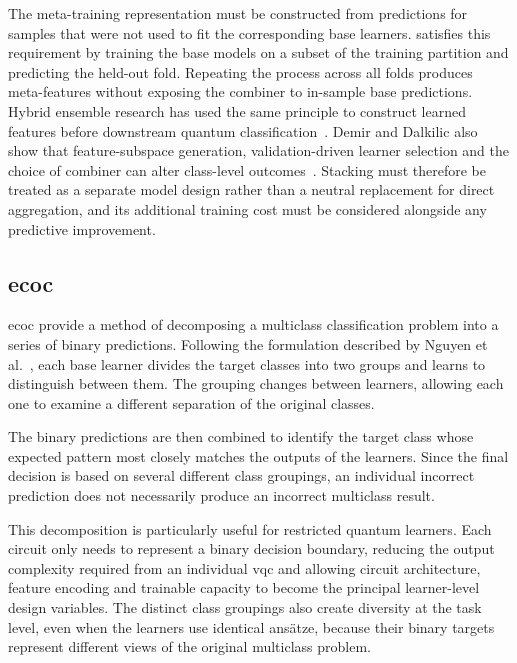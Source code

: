 \documentclass[]{UCD_CS_MSc_AAI_Report}
\begin{document}
The meta-training representation must be constructed from predictions for samples that were not used to fit the corresponding base learners.  satisfies this requirement by training the base models on a subset of the training partition and predicting the held-out fold. Repeating the process across all folds produces meta-features without exposing the combiner to in-sample base predictions. Hybrid ensemble research has used the same principle to construct learned features before downstream quantum classification~\cite{xiong_hybrid_2024}. Demir and Dalkilic also show that feature-subspace generation, validation-driven learner selection and the choice of combiner can alter class-level outcomes~\cite{demir_modified_2018}. Stacking must therefore be treated as a separate model design rather than a neutral replacement for direct aggregation, and its additional training cost must be considered alongside any predictive improvement.

\subsection{\acs*{ecoc}}

\ac{ecoc} provide a method of decomposing a multiclass classification problem into a series of binary predictions. Following the formulation described by Nguyen et al.~\cite{nguyen_optimal_2021}, each base learner divides the target classes into two groups and learns to distinguish between them. The grouping changes between learners, allowing each one to examine a different separation of the original classes.

The binary predictions are then combined to identify the target class whose expected pattern most closely matches the outputs of the learners. Since the final decision is based on several different class groupings, an individual incorrect prediction does not necessarily produce an incorrect multiclass result.

This decomposition is particularly useful for restricted quantum learners. Each circuit only needs to represent a binary decision boundary, reducing the output complexity required from an individual \ac{vqc} and allowing circuit architecture, feature encoding and trainable capacity to become the principal learner-level design variables. The distinct class groupings also create diversity at the task level, even when the learners use identical ansätze, because their binary targets represent different views of the original multiclass problem.
\end{document}
